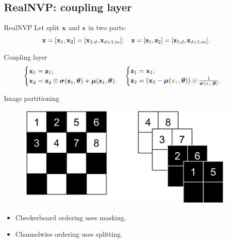 \subsection{RealNVP: coupling layer}
\begin{frame}{RealNVP}
	\vspace{-0.5cm}
	Let split $\mathbf{x}$ and $\mathbf{z}$ in two parts: 
	\[
		\mathbf{x} = [\mathbf{x}_1, \mathbf{x}_2] = [\mathbf{x}_{1:d}, \mathbf{x}_{d+1:m}]; \quad \mathbf{z} = [\mathbf{z}_1, \mathbf{z}_2] = [\mathbf{z}_{1:d}, \mathbf{z}_{d+1:m}].
	\]
	\vspace{-0.7cm}
	\begin{block}{Coupling layer}
		\vspace{-0.7cm}
		\[
			\begin{cases} \bx_1 = \bz_1; \\ \bx_2 = \bz_2 \odot \bsigma(\bz_1, \btheta) + \bmu(\bz_1, \btheta).\end{cases}  
			\begin{cases} \bz_1 = \bx_1; \\ \bz_2 = \left(\bx_2 - \bmu({\color{olive}\bx_1}, \btheta) \right) \odot \frac{1}{\bsigma({\color{olive}\bx_1}, \btheta)}.\end{cases}
		\]
	\end{block}
	\vspace{-0.5cm}
	\begin{block}{Image partitioning}
		
		\begin{minipage}[t]{0.5\columnwidth}
			\begin{figure}
				\centering
				\includegraphics[width=\linewidth]{figs/realnvp_masking.png}
			\end{figure}
		\end{minipage}%
		\begin{minipage}[t]{0.5\columnwidth}
			\begin{itemize}
				\item Checkerboard ordering uses masking.
				\item Channelwise ordering uses splitting.
			\end{itemize}
		\end{minipage}
	\end{block}
	\vspace{-0.5cm}
\end{frame}
